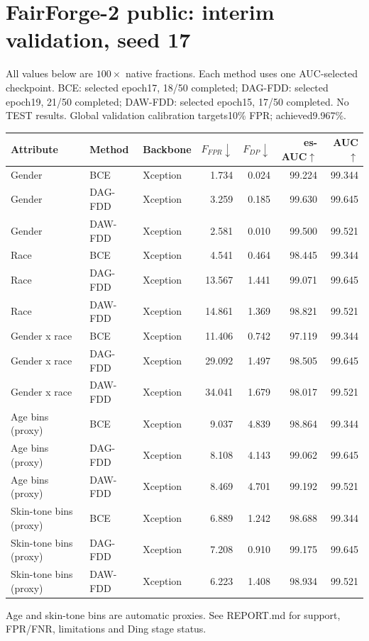 \documentclass{article}
\begin{document}
\section*{FairForge-2 public: interim validation, seed 17}
All values below are $100\times$ native fractions. Each method uses one AUC-selected checkpoint.
BCE: selected epoch17, 18/50 completed; DAG-FDD: selected epoch19, 21/50 completed; DAW-FDD: selected epoch15, 17/50 completed.
No TEST results. Global validation calibration targets10\% FPR; achieved9.967\%.
\begin{center}\begin{tabular}{lllrrrr}\toprule
Attribute & Method & Backbone & $F_{FPR}\downarrow$ & $F_{DP}\downarrow$ & es-AUC$\uparrow$ & AUC$\uparrow$ \\ \midrule
Gender & BCE & Xception & 1.734 & 0.024 & 99.224 & 99.344 \\
Gender & DAG-FDD & Xception & 3.259 & 0.185 & 99.630 & 99.645 \\
Gender & DAW-FDD & Xception & 2.581 & 0.010 & 99.500 & 99.521 \\
\midrule
Race & BCE & Xception & 4.541 & 0.464 & 98.445 & 99.344 \\
Race & DAG-FDD & Xception & 13.567 & 1.441 & 99.071 & 99.645 \\
Race & DAW-FDD & Xception & 14.861 & 1.369 & 98.821 & 99.521 \\
\midrule
Gender x race & BCE & Xception & 11.406 & 0.742 & 97.119 & 99.344 \\
Gender x race & DAG-FDD & Xception & 29.092 & 1.497 & 98.505 & 99.645 \\
Gender x race & DAW-FDD & Xception & 34.041 & 1.679 & 98.017 & 99.521 \\
\midrule
Age bins (proxy) & BCE & Xception & 9.037 & 4.839 & 98.864 & 99.344 \\
Age bins (proxy) & DAG-FDD & Xception & 8.108 & 4.143 & 99.062 & 99.645 \\
Age bins (proxy) & DAW-FDD & Xception & 8.469 & 4.701 & 99.192 & 99.521 \\
\midrule
Skin-tone bins (proxy) & BCE & Xception & 6.889 & 1.242 & 98.688 & 99.344 \\
Skin-tone bins (proxy) & DAG-FDD & Xception & 7.208 & 0.910 & 99.175 & 99.645 \\
Skin-tone bins (proxy) & DAW-FDD & Xception & 6.223 & 1.408 & 98.934 & 99.521 \\
\bottomrule\end{tabular}\end{center}
Age and skin-tone bins are automatic proxies. See REPORT.md for support, FPR/FNR, limitations and Ding stage status.
\end{document}
